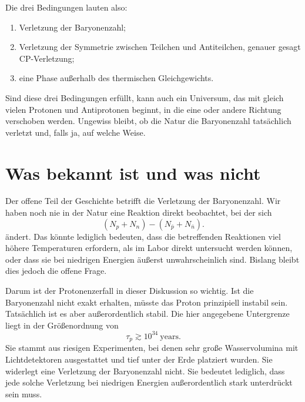 Die drei Bedingungen lauten also:
\begin{enumerate}
\item Verletzung der Baryonenzahl;
\item Verletzung der Symmetrie zwischen Teilchen und Antiteilchen, genauer gesagt CP-Verletzung;
\item eine Phase außerhalb des thermischen Gleichgewichts.
\end{enumerate}

\begin{classroomqa}
\end{classroomqa}

Sind diese drei Bedingungen erfüllt, kann auch ein Universum, das mit gleich vielen Protonen und Antiprotonen beginnt, in die eine oder andere Richtung verschoben werden. Ungewiss bleibt, ob die Natur die Baryonenzahl tatsächlich verletzt und, falls ja, auf welche Weise.

\section{Was bekannt ist und was nicht}

Der offene Teil der Geschichte betrifft die Verletzung der Baryonenzahl. Wir haben noch nie in der Natur eine Reaktion direkt beobachtet, bei der sich
\[
(N_p+N_n)-(N_{\bar p}+N_{\bar n}).
\]
ändert. Das könnte lediglich bedeuten, dass die betreffenden Reaktionen viel höhere Temperaturen erfordern, als im Labor direkt untersucht werden können, oder dass sie bei niedrigen Energien äußerst unwahrscheinlich sind. Bislang bleibt dies jedoch die offene Frage.

Darum ist der Protonenzerfall in dieser Diskussion so wichtig. Ist die Baryonenzahl nicht exakt erhalten, müsste das Proton prinzipiell instabil sein. Tatsächlich ist es aber außerordentlich stabil. Die hier angegebene Untergrenze liegt in der Größenordnung von
\[
\tau_p \gtrsim 10^{34}\ \text{years}.
\]
Sie stammt aus riesigen Experimenten, bei denen sehr große Wasservolumina mit Lichtdetektoren ausgestattet und tief unter der Erde platziert wurden. Sie widerlegt eine Verletzung der Baryonenzahl nicht. Sie bedeutet lediglich, dass jede solche Verletzung bei niedrigen Energien außerordentlich stark unterdrückt sein muss.

